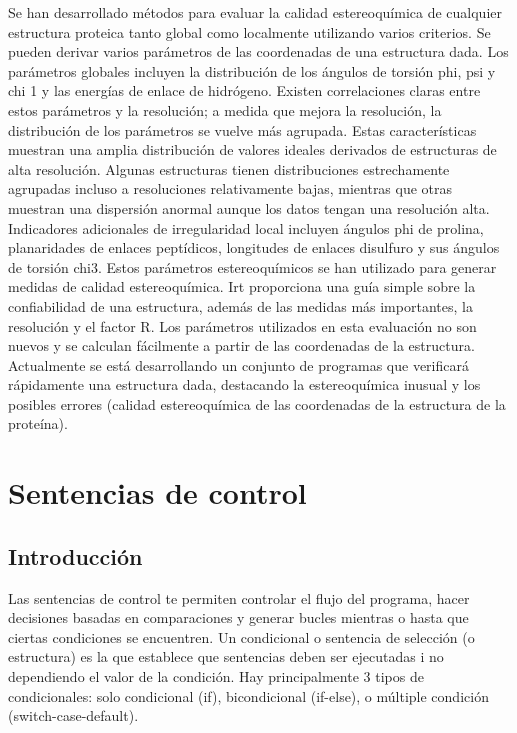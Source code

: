 \documentclass[11pt, letterpaper, spanish]{article}
\begin{document}
{{{\par{Se han desarrollado métodos para evaluar la calidad estereoquímica de cualquier estructura proteica tanto global como localmente utilizando varios criterios. Se pueden derivar varios parámetros de las coordenadas de una estructura dada. Los parámetros globales incluyen la distribución de los ángulos de torsión phi, psi y chi 1 y las energías de enlace de hidrógeno. Existen correlaciones claras entre estos parámetros y la resolución; a medida que mejora la resolución, la distribución de los parámetros se vuelve más agrupada. Estas características muestran una amplia distribución de valores ideales derivados de estructuras de alta resolución. Algunas estructuras tienen distribuciones estrechamente agrupadas incluso a resoluciones relativamente bajas, mientras que otras muestran una dispersión anormal aunque los datos tengan una resolución alta. Indicadores adicionales de irregularidad local incluyen ángulos phi de prolina, planaridades de enlaces peptídicos, longitudes de enlaces disulfuro y sus ángulos de torsión chi3. Estos parámetros estereoquímicos se han utilizado para generar medidas de calidad estereoquímica. Irt proporciona una guía simple sobre la confiabilidad de una estructura, además de las medidas más importantes, la resolución y el factor R. Los parámetros utilizados en esta evaluación no son nuevos y se calculan fácilmente a partir de las coordenadas de la estructura. Actualmente se está desarrollando un conjunto de programas que verificará rápidamente una estructura dada, destacando la estereoquímica inusual y los posibles errores (calidad estereoquímica de las coordenadas de la estructura de la proteína).}
\newpage

\section{Sentencias de control}
\subsection{Introducción}
\par{Las sentencias de control te permiten controlar el flujo del programa, hacer decisiones basadas en comparaciones y generar bucles mientras o hasta que ciertas condiciones se encuentren. Un condicional o sentencia de selección (o estructura) es la que establece que sentencias deben ser ejecutadas i no dependiendo el valor de la condición. Hay principalmente 3 tipos de condicionales: solo condicional (if), bicondicional (if-else), o múltiple condición (switch-case-default)}.
}}}
\end{document}
